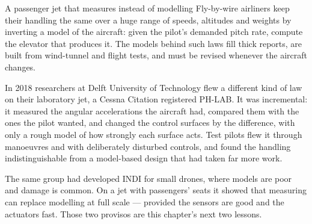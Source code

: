 \begin{curiosity}{A passenger jet that measures instead of modelling}
Fly-by-wire airliners keep their handling the same over a huge range of speeds, altitudes and weights by inverting a model of the aircraft: given the pilot's demanded pitch rate, compute the elevator that produces it. The models behind such laws fill thick reports, are built from wind-tunnel and flight tests, and must be revised whenever the aircraft changes.

In 2018 researchers at Delft University of Technology flew a different kind of law on their laboratory jet, a Cessna Citation registered PH-LAB. It was incremental: it measured the angular accelerations the aircraft had, compared them with the ones the pilot wanted, and changed the control surfaces by the difference, with only a rough model of how strongly each surface acts. Test pilots flew it through manoeuvres and with deliberately disturbed controls, and found the handling indistinguishable from a model-based design that had taken far more work.

The same group had developed INDI for small drones, where models are poor and damage is common. On a jet with passengers' seats it showed that measuring can replace modelling at full scale — provided the sensors are good and the actuators fast. Those two provisos are this chapter's next two lessons.
\end{curiosity}


